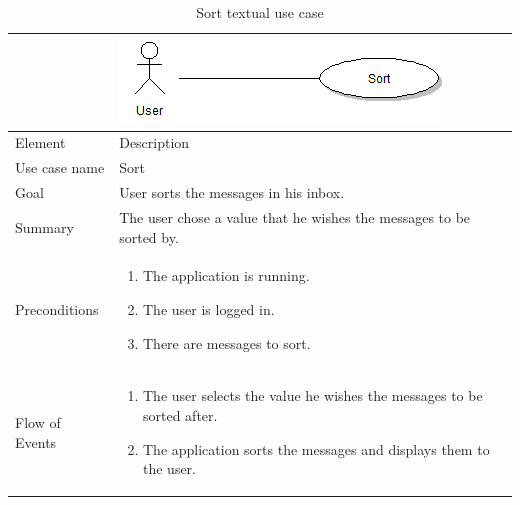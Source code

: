 \begin{table}
\begin{tabular}{p{3cm}p{12cm}}
& \includegraphics{sort}\\ \hline
Element & Description \\ \hline
Use case name & Sort \\
Goal & User sorts the messages in his inbox. \\
Summary & The user chose a value that he wishes the messages to be sorted by. \\
Preconditions &
\begin{enumerate}
\item{}The application is running.
\item{}The user is logged in.
\item{}There are messages to sort.
\end{enumerate} \\ \hline
Flow of Events &
\begin{enumerate}
\item{}The user selects the value he wishes the messages to be sorted after.
\item{}The application sorts the messages and displays them to the user.
\end{enumerate}
\end{tabular}
\caption{Sort textual use case} \label{tab:search}
\end{table}

